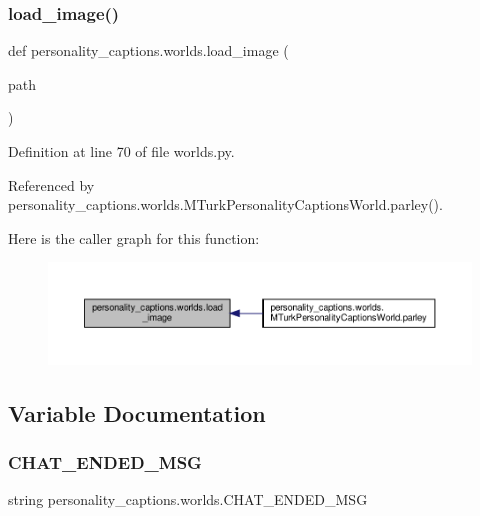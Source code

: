 \subsubsection{\texorpdfstring{load\+\_\+image()}{load\_image()}}
{\footnotesize\ttfamily def personality\+\_\+captions.\+worlds.\+load\+\_\+image (\begin{DoxyParamCaption}\item[{}]{path }\end{DoxyParamCaption})}



Definition at line 70 of file worlds.\+py.



Referenced by personality\+\_\+captions.\+worlds.\+M\+Turk\+Personality\+Captions\+World.\+parley().

Here is the caller graph for this function\+:
\nopagebreak
\begin{figure}[H]
\begin{center}
\leavevmode
\includegraphics[width=350pt]{namespacepersonality__captions_1_1worlds_a2863737d97a8e8c5a1ebe9029d0d2293_icgraph}
\end{center}
\end{figure}


\subsection{Variable Documentation}
\mbox{\label{namespacepersonality__captions_1_1worlds_a2c1871523ae91d2b9938c26326eb2ae1}} 
\subsubsection{\texorpdfstring{C\+H\+A\+T\+\_\+\+E\+N\+D\+E\+D\+\_\+\+M\+SG}{CHAT\_ENDED\_MSG}}
{\footnotesize\ttfamily string personality\+\_\+captions.\+worlds.\+C\+H\+A\+T\+\_\+\+E\+N\+D\+E\+D\+\_\+\+M\+SG}

